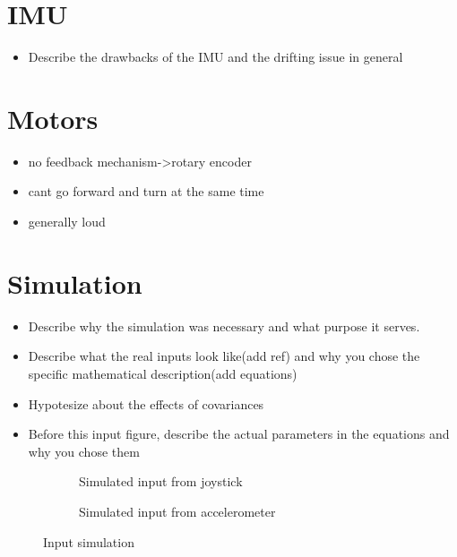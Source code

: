\section{IMU}\label{imu_lim}
\begin{itemize}
 \item Describe the drawbacks of the IMU and the drifting issue in general
\end{itemize}

\section{Motors}\label{motor_lim}
\begin{itemize}
 \item no feedback mechanism->rotary encoder
 \item cant go forward and turn at the same time
 \item generally loud
\end{itemize}

\section{Simulation}\label{sec:sim}

\begin{itemize}
 \item Describe why the simulation was necessary and what purpose it serves.
 \item Describe what the real inputs look like(add ref) and why you chose the specific mathematical description(add equations)
 \item Hypotesize about the effects of covariances
\end{itemize}
\hrulefill
\begin{itemize}
 \item Before this input figure, describe the actual parameters in the equations and why you chose them
\end{itemize}

\begin{figure}[h]
 \begin{subfigure}[b]{0.45\textwidth}
  \label{InputVelSim}
  \caption{Simulated input from joystick}
 \end{subfigure}
 \hfill
 \begin{subfigure}[b]{0.45\textwidth}
  \label{InputAccelSim}
  \caption{Simulated input from accelerometer}
 \end{subfigure}
 \caption{Input simulation}
\end{figure}

